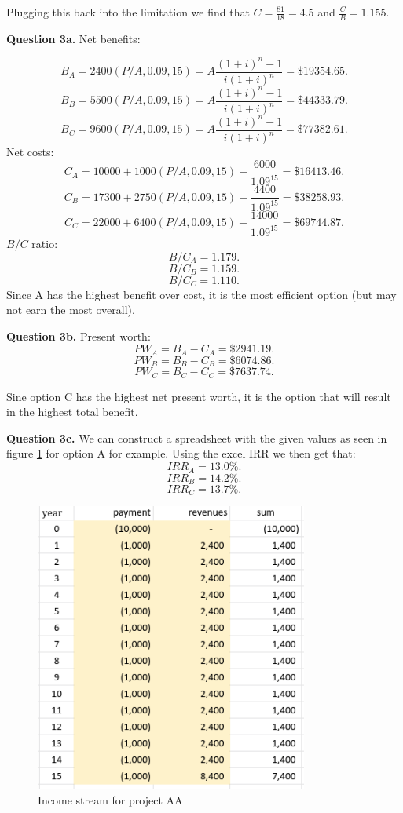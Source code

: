\documentclass[letterpaper, reqno,11pt]{article}
\begin{document}
Plugging this back into the limitation we find that $C=\frac{81}{18}=4.5$ and $\frac{C}{B}=1.155$. 

{\noindent\bf Question 3a.} Net benefits: 

\[
B_A=2400 (P/A, 0.09, 15)=A \frac{(1+i)^{n}-1}{i(1+i)^{n}}=\$19354.65
.\]
\[
B_B=5500 (P/A, 0.09, 15)=A \frac{(1+i)^{n}-1}{i(1+i)^{n}}=\$44333.79
.\]
\[
B_C=9600 (P/A, 0.09, 15)=A \frac{(1+i)^{n}-1}{i(1+i)^{n}}=\$77382.61
.\]
Net costs: 
\[
C_A=10000+1000 (P/A, 0.09, 15)-\frac{6000}{1.09^{15}}=\$16413.46
.\]
\[
C_B=17300+2750 (P/A, 0.09, 15)-\frac{4400}{1.09^{15}}=\$38258.93
.\]
\[
C_C=22000+6400 (P/A, 0.09, 15)-\frac{14000}{1.09^{15}}=\$69744.87
.\]
$B /C$ ratio: 
\[
B /C_A=1.179
.\]
\[
B /C_B=1.159
.\]
\[
B /C_C=1.110
.\]
Since A has the highest benefit over cost, it is the most efficient option (but may not earn the most overall). 

{\noindent\bf Question 3b.} Present worth: 
\[
PW_A=B_A-C_A=\$2941.19
.\]
\[
PW_B=B_B-C_B=\$6074.86
.\]
\[
PW_C=B_C-C_C=\$7637.74
.\]

Sine option C has the highest net present worth, it is the option that will result in the highest total benefit. 

{\noindent\bf Question 3c.} We can construct a spreadsheet with the given values as seen in figure \ref{fig:q3} for option A for example. Using the excel IRR we then get that: 
\[
IRR_A=13.0\%
.\]
\[
IRR_B=14.2\%
.\]
\[
IRR_C=13.7\%
.\]

\begin{figure}[htpb]
    \centering
    \includegraphics[width=0.8\textwidth]{q3}
    \caption{Income stream for project AA}
    \label{fig:q3}
\end{figure}
\end{document}
